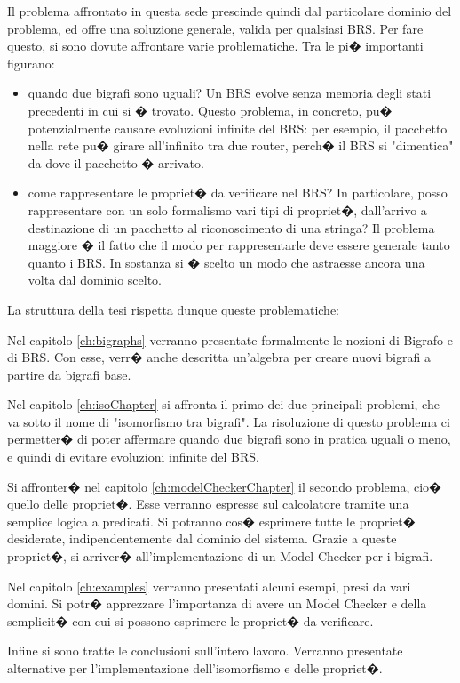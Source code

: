 Il problema affrontato in questa sede prescinde quindi dal particolare dominio del problema, ed offre una soluzione generale, valida per qualsiasi BRS.
Per fare questo, si sono dovute affrontare varie problematiche. Tra le pi� importanti figurano:
\begin{itemize}
  \item
  quando due bigrafi sono uguali? Un BRS evolve senza memoria degli stati precedenti in cui si � trovato. Questo problema, in concreto, pu� potenzialmente
  causare evoluzioni infinite del BRS: per esempio, il pacchetto nella rete pu� girare all'infinito tra due router, perch� il BRS si "dimentica" da dove il pacchetto
  � arrivato.
  \item
  come rappresentare le propriet� da verificare nel BRS? In particolare, posso rappresentare con un solo formalismo vari tipi di propriet�, dall'arrivo a destinazione di
  un pacchetto al riconoscimento di una stringa?
  Il problema maggiore � il fatto che il modo per rappresentarle deve essere generale tanto quanto i BRS. In
  sostanza si � scelto un modo che astraesse ancora una volta dal dominio scelto.
\end{itemize}



La struttura della tesi rispetta dunque queste problematiche:

Nel capitolo \ref{ch:bigraphs} verranno presentate formalmente le nozioni di Bigrafo e di BRS. Con esse, verr� anche descritta un'algebra per creare nuovi bigrafi a partire da
bigrafi base.

Nel capitolo \ref{ch:isoChapter} si affronta il primo dei due principali problemi, che va sotto il nome di "isomorfismo tra bigrafi". La risoluzione di questo problema ci permetter� di poter affermare quando due bigrafi sono in pratica uguali o meno, e quindi di evitare evoluzioni infinite del BRS.

Si affronter� nel capitolo \ref{ch:modelCheckerChapter} il secondo problema, cio� quello delle propriet�. Esse verranno espresse sul calcolatore tramite una semplice logica a predicati. Si potranno cos� esprimere tutte le propriet� desiderate, indipendentemente dal dominio del sistema. Grazie a queste propriet�, si arriver� all'implementazione di un Model Checker per i bigrafi.

Nel capitolo \ref{ch:examples} verranno presentati alcuni esempi, presi da vari domini. Si potr� apprezzare l'importanza di avere un Model Checker e della semplicit� con cui si possono esprimere le propriet� da verificare.

Infine si sono tratte le conclusioni sull'intero lavoro. Verranno presentate alternative per l'implementazione dell'isomorfismo e delle propriet�.


















